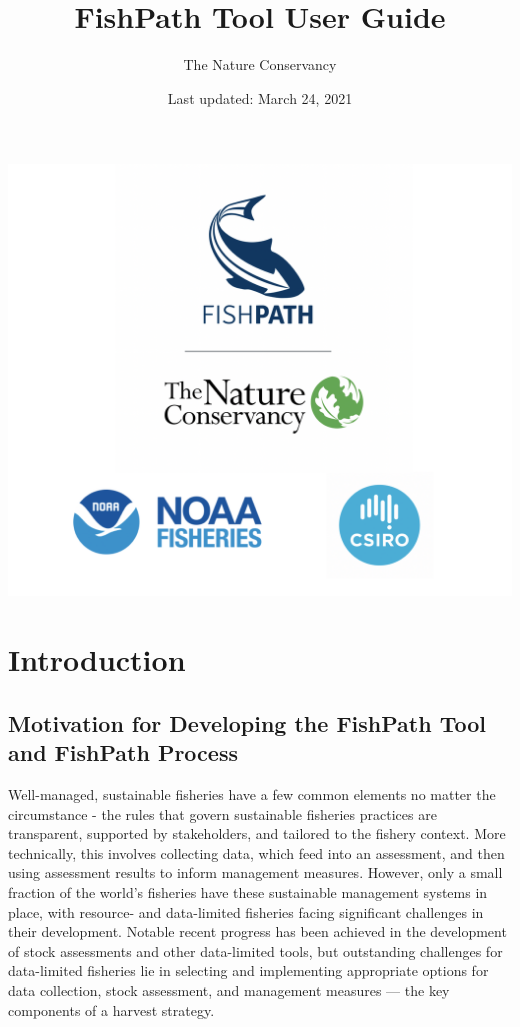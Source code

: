 \documentclass[
  11pt,
]{book}
\title{FishPath Tool User Guide}
\author{The Nature Conservancy}
\date{Last updated: March 24, 2021}
\begin{document}
\maketitle

{
\setcounter{tocdepth}{1}
\tableofcontents
}
\hypertarget{section}{%
\chapter*{}\label{section}}

\begin{center}\includegraphics[width=0.75\linewidth]{images/3-logos} \end{center}

\hypertarget{intro}{%
\chapter{Introduction}\label{intro}}

\hypertarget{motivation}{%
\section{Motivation for Developing the FishPath Tool and FishPath Process}\label{motivation}}

Well-managed, sustainable fisheries have a few common elements no matter the circumstance - the rules that govern sustainable fisheries practices are transparent, supported by stakeholders, and tailored to the fishery context. More technically, this involves collecting data, which feed into an assessment, and then using assessment results to inform management measures. However, only a small fraction of the world's fisheries have these sustainable management systems in place, with resource- and data-limited fisheries facing significant challenges in their development. Notable recent progress has been achieved in the development of stock assessments and other data-limited tools, but outstanding challenges for data-limited fisheries lie in selecting and implementing appropriate options for data collection, stock assessment, and management measures --- the key components of a harvest strategy.
\end{document}
